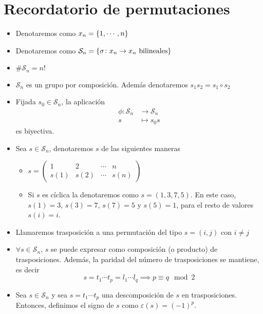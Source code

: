 \section{Recordatorio de permutaciones}

\begin{itemize}
    \item Denotaremos como $x_n = \left\{1, \cdots, n\right\}$
    \item Denotaremos como $\mathcal{S}_n =\left\{\sigma\colon x_n \to
        x_n \text{ bilineales}\right\}$
    \item $\#\mathcal{S}_n= n!$
    \item $\mathcal{S}_n$ es un grupo por composición. Además denotaremos
        $s_1 s_2 = s_1 \circ s_2$
    \item\label{obs:perm_biy} Fijada $s_0 \in \mathcal{S}_n$, la aplicación
        \[
            \begin{aligned}
                \phi \colon \mathcal{S}_n &\to \mathcal{S}_n \\
                s &\mapsto s_0s
            \end{aligned}
        \]
        es biyectiva.
    \item Sea $s \in \mathcal{S}_n$, denotaremos $s$  de las siguientes maneras
        \begin{itemize}
            \item $s = \begin{pmatrix}
                1 & 2 & \cdots & n \\
                s(1) & s(2) & \cdots & s(n)
            \end{pmatrix}$
            \item Si $s$ es cíclica la denotaremos como $s = (1,3,7,5)$. En este
            caso, $s(1)=3$, $s(3)=7$, $s(7)=5$ y $s(5)=1$, para el resto de valores
            $s(i)=i$.
        \end{itemize}
    \item Llamaremos trasposición a una permutación del tipo $s=(i,j)$ con
        $i \neq j$
    \item $\forall s \in \mathcal{S}_n$, $s$ se puede expresar como composición
        (o producto) de trasposiciones. Además, la paridad del número de
        trasposiciones se mantiene, es decir
        \[
            s = t_1 \cdots t_p = l_1 \cdots l_q \implies p \equiv q \mod 2
        \]
    \item Sea $s \in \mathcal{S}_n$ y sea $s=t_1 \cdots t_p$ una descomposición de
        $s$ en trasposiciones. Entonces, definimos el signo de $s$ como
        $\varepsilon(s) = (-1)^p$.
\end{itemize}

